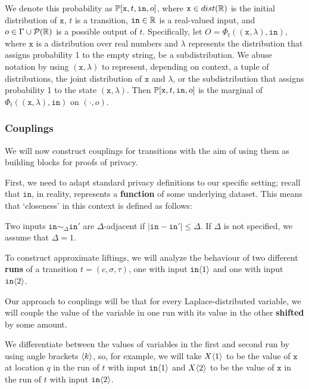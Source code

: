 We denote this probability as $\mathbb{P}[\texttt{x}, t, \texttt{in}, o]$, where $\texttt{x} \in dist(\mathbb{R})$ is the initial distribution of $\texttt{x}$, $t$ is a transition, $\texttt{in}\in \mathbb{R}$ is a real-valued input, and $o\in \Gamma\cup \mathcal{P}(\mathbb{R})$ is a possible output of $t$. 
Specifically, let $O = \Phi_t((\texttt{x}, \lambda), \texttt{in})$, where $\texttt{x}$ is a distribution over real numbers and $\lambda$ represents the distribution that assigns probability 1 to the empty string, be a subdistribution.
 We abuse notation by using $(\texttt{x}, \lambda)$ to represent, depending on context, a tuple of distributions, the joint distribution of $\texttt{x}$ and $\lambda$, or the subdistribution that assigns probability 1 to the state $(\texttt{x}, \lambda)$. Then $\mathbb{P}[\texttt{x}, t, \texttt{in}, o]$ is the marginal of $\Phi_t((\texttt{x}, \lambda), \texttt{in})$ on $(\cdot, o)$. 

\subsubsection{Couplings}

We will now construct couplings for transitions with the aim of using them as building blocks for proofs of privacy.

First, we need to adapt standard privacy definitions to our specific setting; recall that $\texttt{in}$, in reality, represents a \textbf{function} of some underlying dataset. This means that `closeness' in this context is defined as follows:

\begin{defn}[Adjacency]
    Two inputs $\texttt{in}\sim_{\Delta} \texttt{in}'$ are $\Delta$-adjacent if $|\texttt{in}-\texttt{in}'|\leq \Delta$. If $\Delta$ is not specified, we assume that $\Delta = 1$. 
\end{defn}

To construct approximate liftings, we will analyze the behaviour of two different \textbf{runs} of a transition $t = (c, \sigma, \tau)$, one with input $\texttt{in}\langle1 \rangle$ and one with input $\texttt{in}\langle2 \rangle$. 

Our approach to couplings will be that for every Laplace-distributed variable, we will couple the value of the variable in one run with its value in the other \textbf{shifted} by some amount. 

We differentiate between the values of variables in the first and second run by using angle brackets $\langle k \rangle$, so, for example, we will take $X\langle1 \rangle$ to be the value of $\texttt{x}$ at location $q$ in the run of $t$ with input $\texttt{in}\langle1 \rangle$ and $X\langle2 \rangle$ to be the value of $\texttt{x}$ in the run of $t$ with input $\texttt{in}\langle2 \rangle$. 

